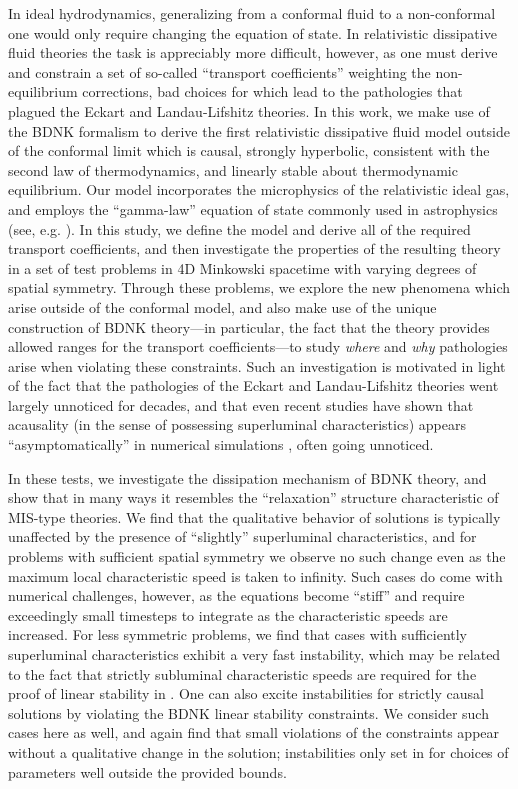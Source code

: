 \documentclass[%
notitlepage,
superscriptaddress,
nofootinbib,
amsmath,
amssymb,
aps,
twocolumn
]{revtex4-1}
\begin{document}
  In ideal hydrodynamics, generalizing from a conformal fluid to a
  non-conformal one would only require changing the equation of state.  In
  relativistic dissipative fluid theories the task is appreciably more
  difficult, however, as one must derive and constrain a set of so-called
  ``transport coefficients'' weighting the non-equilibrium corrections, bad
  choices for which lead to the pathologies that plagued the Eckart and
  Landau-Lifshitz theories.  In this work, we make use of the BDNK
  formalism to derive the first relativistic dissipative fluid model
  outside of the conformal limit which is causal, strongly hyperbolic,
  consistent with the second law of thermodynamics, and linearly stable
  about thermodynamic equilibrium.  Our model incorporates the microphysics
  of the relativistic ideal gas, and employs the ``gamma-law'' equation of
  state commonly used in astrophysics (see, e.g. \cite{Rezzolla2013}).  In
  this study, we define the model and derive all of the required transport
  coefficients, and then investigate the properties of the resulting theory
  in a set of test problems in 4D Minkowski spacetime with varying degrees
  of spatial symmetry.  Through these problems, we explore the new
  phenomena which arise outside of the conformal model, and also make use
  of the unique construction of BDNK theory---in particular, the fact that
  the theory provides allowed ranges for the transport coefficients---to
  study \textit{where} and \textit{why} pathologies arise when violating
  these constraints.  Such an investigation is motivated in light of the
  fact that the pathologies of the Eckart and Landau-Lifshitz theories went
  largely unnoticed for decades, and that even recent studies have shown
  that acausality (in the sense of possessing superluminal
  characteristics) appears ``asymptomatically'' in numerical simulations
  \cite{Plumberg:2021bme}, often going unnoticed.

In these tests, we investigate the dissipation mechanism of BDNK
theory, and show that in many ways it resembles the ``relaxation''
structure characteristic of MIS-type theories.  We find that the
qualitative behavior of solutions is typically unaffected by the
presence of ``slightly'' superluminal characteristics, and for problems
with sufficient spatial symmetry we observe no such change even as the
maximum local characteristic speed is taken to infinity.  Such cases do
come with numerical challenges, however, as the equations become
``stiff'' and require exceedingly small timesteps to integrate as the
characteristic speeds are increased.  For less symmetric problems, we
find that cases with sufficiently superluminal characteristics exhibit
a very fast instability, which may be related to the fact that
strictly subluminal characteristic speeds are required for the proof of
linear stability in \cite{Bemfica:2020zjp}.  One can also excite
instabilities for strictly causal solutions by violating the BDNK linear
stability constraints.  We consider such cases here as well, and again find
that small violations of the constraints appear without a qualitative
change in the solution; instabilities only set in for choices of parameters
well outside the provided bounds.
\end{document}
